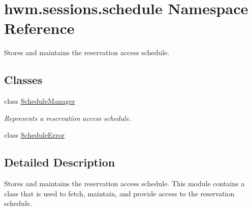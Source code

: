\hypertarget{namespacehwm_1_1sessions_1_1schedule}{\section{hwm.\-sessions.\-schedule Namespace Reference}
\label{namespacehwm_1_1sessions_1_1schedule}
}


Stores and maintains the reservation access schedule.  


\subsection*{Classes}
\begin{DoxyCompactItemize}
\item 
class \hyperlink{classhwm_1_1sessions_1_1schedule_1_1_schedule_manager}{Schedule\-Manager}
\begin{DoxyCompactList}\small\item\em Represents a reservation access schedule. \end{DoxyCompactList}\item 
class \hyperlink{classhwm_1_1sessions_1_1schedule_1_1_schedule_error}{Schedule\-Error}
\end{DoxyCompactItemize}


\subsection{Detailed Description}
Stores and maintains the reservation access schedule. This module contains a class that is used to fetch, maintain, and provide access to the reservation schedule. 